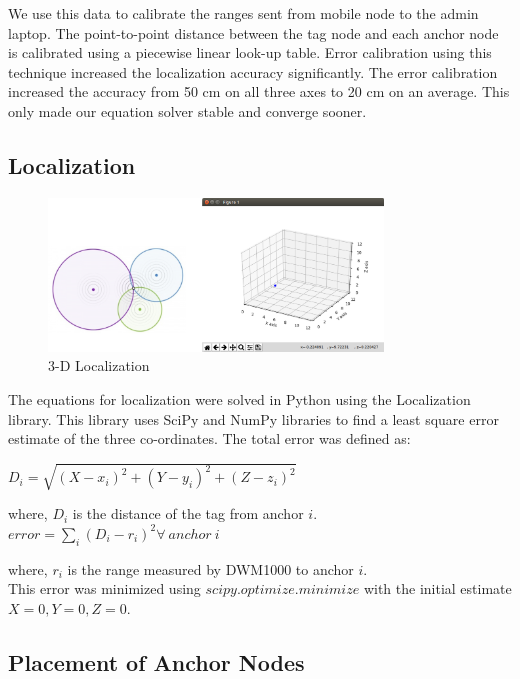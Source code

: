 \documentclass[journal,transmag]{IEEEtran}
\begin{document}
We use this data to calibrate the ranges sent from mobile node to the admin laptop. The point-to-point distance between the tag node and each anchor node is calibrated using a piecewise linear look-up table. Error calibration using this technique increased the localization accuracy significantly. The error calibration increased the accuracy from 50 cm on all three axes to 20 cm on an average. This only made our equation solver stable and converge sooner.




\subsection{Localization}

\begin{figure}[!h]
\centering
\includegraphics[width=3.5in]{3D_localization.png}
\caption{{3-D Localization}}
\label{3dlocalization}
\end{figure}

The equations for localization were solved in Python using the Localization library\cite{kamalshadi:2017}. This library uses SciPy and NumPy libraries to find a least square error estimate of the three co-ordinates. The total error was defined as:

$D_i = \sqrt{(X-x_i)^2 + (Y-y_i)^2 + (Z-z_i)^2}$

where, $D_i$ is the distance of the tag from anchor $i$.\\

$ error = \sum\limits_{i} (D_i - r_i)^2 \forall\ anchor\ i$

where, $r_i$ is the range measured by DWM1000 to anchor $i$.\\

This error was minimized using $scipy.optimize.minimize$ with the initial estimate $X=0,Y=0,Z=0$.



\subsection{Placement of Anchor Nodes}
\end{document}

